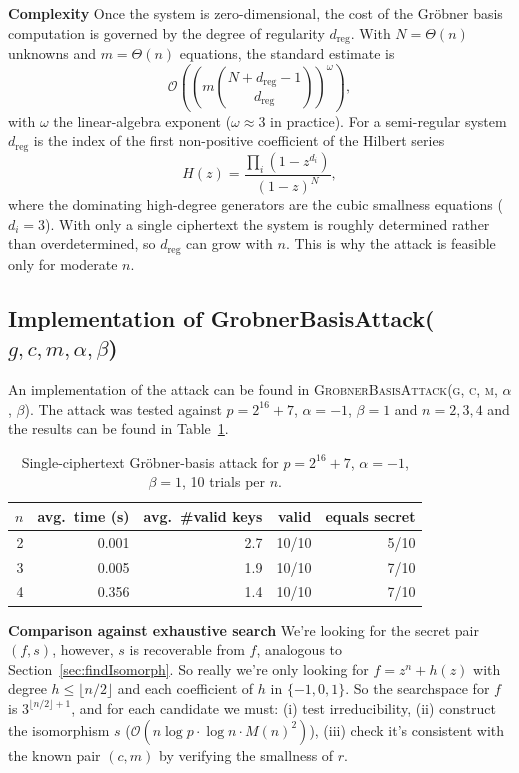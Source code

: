 \documentclass{article}
\begin{document}
\textbf{Complexity}
Once the system is zero-dimensional, the cost of the Gröbner basis
computation is governed by the degree of regularity $d_{\mathrm{reg}}$.
With $N = \Theta(n)$ unknowns and $m = \Theta(n)$ equations, the standard
estimate is
\begin{equation}
  \label{eq:groebnercost}
  \mathcal{O}\!\left( \left( m \binom{N + d_{\mathrm{reg}} - 1}{d_{\mathrm{reg}}}
  \right)^{\!\omega} \right) ,
\end{equation}
with $\omega$ the linear-algebra exponent ($\omega \approx 3$ in practice).
For a semi-regular system $d_{\mathrm{reg}}$ is the index of the first
non-positive coefficient of the Hilbert series
\begin{equation}
  \label{eq:hilbert}
  H(z) = \frac{\prod_{i}\left(1 - z^{d_i}\right)}{(1 - z)^{N}} ,
\end{equation}
where the dominating high-degree generators are the cubic smallness equations ($d_i = 3$). With only a single ciphertext the system is roughly determined rather than overdetermined, so $d_{\mathrm{reg}}$ can grow with $n$. This is why the attack is feasible only for moderate $n$.

\subsection{Implementation of GrobnerBasisAttack($g, c, m, \alpha, \beta$)}
An implementation of the attack can be found in \textsc{GrobnerBasisAttack(g, c, m, $\alpha$, $\beta$)}. The attack was tested against $p=2^{16}+7$, $\alpha = -1$, $\beta = 1$ and $n = 2, 3, 4$ and the results can be found in Table~\ref{tab:gba}.

\begin{table}[h]
\centering
\begin{tabular}{r|r|r|r|r}
\hline
$n$ & avg.\ time (s) & avg.\ \#valid keys & valid & equals secret \\
\hline
2 & 0.001 & 2.7 & 10/10 & 5/10 \\
3 & 0.005 & 1.9 & 10/10 & 7/10 \\
4 & 0.356 & 1.4 & 10/10 & 7/10 \\
\hline
\end{tabular}
\caption{Single-ciphertext Gröbner-basis attack for $p=2^{16}+7$, $\alpha=-1$, $\beta=1$, 10 trials per $n$.}
\label{tab:gba}
\end{table}

\textbf{Comparison against exhaustive search}
We're looking for the secret pair $(f, s)$, however, $s$ is recoverable from $f$, analogous to Section~\ref{sec:findIsomorph}. So really we're only looking for $f = z^n + h(z)$ with degree $h \le \lfloor n/2 \rfloor$ and each coefficient of $h$ in $\{-1, 0, 1\}$. So the searchspace for $f$ is $3^{\lfloor n/2 \rfloor + 1}$, and for each candidate we must: (i) test irreducibility, (ii) construct the isomorphism $s$ ($\mathcal{O}(n \log p \cdot \log n \cdot M(n)^2)$), (iii) check it's consistent with the known pair $(c,m)$ by verifying the smallness of $r$.
\end{document}
